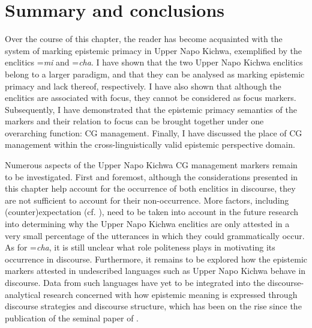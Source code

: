 \documentclass[output=paper]{langscibook}
\begin{document}
\section{Summary and conclusions}\label{s:kg7}

Over the course of this chapter, the reader has become acquainted with the system of marking epistemic primacy in Upper Napo Kichwa, exemplified by the enclitics =\textit{mi} and =\textit{cha}. I have shown that the two Upper Napo Kichwa enclitics belong to a larger paradigm, and that they can be analysed as marking epistemic primacy and lack thereof, respectively. I have also shown that although the enclitics are associated with focus, they cannot be considered as focus markers. Subsequently, I have demonstrated that the epistemic primacy semantics of the markers and their relation to focus can be brought together under one overarching function: CG management. Finally, I have discussed the place of CG management within the cross-linguistically valid epistemic perspective domain.

Numerous aspects of the Upper Napo Kichwa CG management markers remain to be investigated. First and foremost, although the considerations presented in this chapter help account for the occurrence of both enclitics in discourse, they are not sufficient to account for their non-occurrence. More factors, including (counter)expectation (cf. \citealt{Matic2015}), need to be taken into account in the future research into determining why the Upper Napo Kichwa enclitics are only attested in a very small percentage of the utterances in which they could grammatically occur. As for =\textit{cha}, it is still unclear what role politeness plays in motivating its occurrence in discourse. Furthermore, it remains to be explored how the epistemic markers attested in undescribed languages such as Upper Napo Kichwa behave in discourse. Data from such languages have yet to be integrated into the discourse-analytical research concerned with how epistemic meaning is expressed through discourse strategies and discourse structure, which has been on the rise since the publication of the seminal paper of \cite{Heritage2005}.
\end{document}
